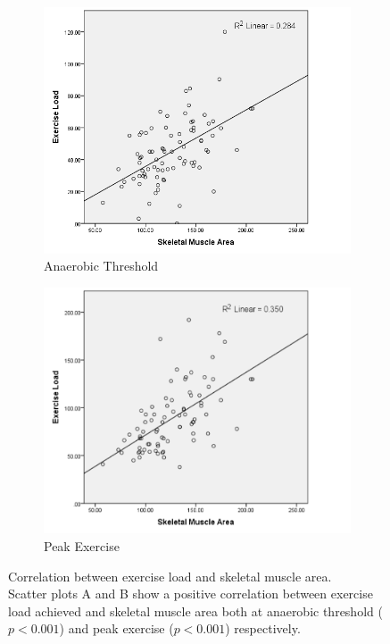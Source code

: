 \begin{figure}[htb]
	\centering
	\begin{subfigure}[b]{0.45\textwidth}
		\centering
		\includegraphics[width=\textwidth]{Figures/bc_scatter_atLoad_skeletal}
		\caption{Anaerobic Threshold}
		\label{fig:bc_at_load_vs_sm}
	\end{subfigure}
	\hfill
	\begin{subfigure}[b]{0.45\textwidth}
		\centering
		\includegraphics[width=\textwidth]{Figures/bc_scatter_pkLoad_skeletal}
		\caption{Peak Exercise}
		\label{fig:bc_pk_load_vs_sm}
	\end{subfigure}
	\caption[Correlation between exercise load and skeletal muscle area.]
	{Correlation between exercise load and skeletal muscle area.
		\\ Scatter plots A and B show a positive correlation between exercise load achieved and skeletal muscle area both at anaerobic threshold ($p < 0.001$) and peak exercise ($p < 0.001$) respectively.}	
	\label{fig:bc_load_vs_sm}
	
\end{figure}

